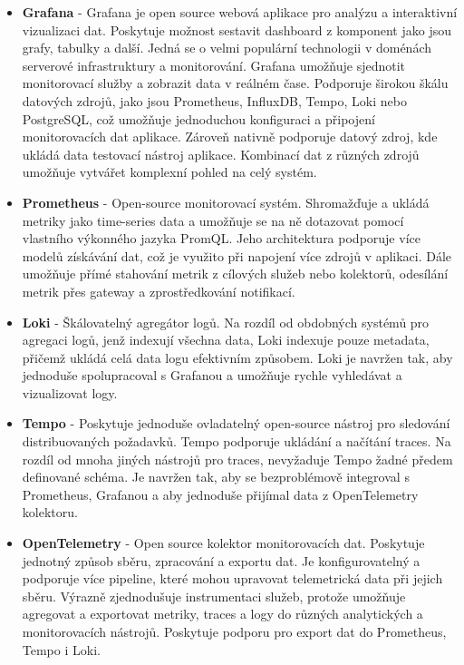 \begin{itemize}
  \item \textbf{Grafana} - Grafana je open source webová aplikace pro analýzu a interaktivní vizualizaci dat. Poskytuje možnost sestavit dashboard z komponent jako jsou grafy, tabulky a další. Jedná se o velmi populární technologii v doménách serverové infrastruktury a monitorování. Grafana umožňuje sjednotit monitorovací služby a zobrazit data v reálném čase. Podporuje širokou škálu datových zdrojů, jako jsou Prometheus, InfluxDB, Tempo, Loki nebo PostgreSQL, což umožňuje jednoduchou konfiguraci a připojení monitorovacích dat aplikace. Zároveň nativně podporuje datový zdroj, kde ukládá data testovací nástroj aplikace. Kombinací dat z různých zdrojů umožňuje vytvářet komplexní pohled na celý systém.
  \item \textbf{Prometheus} - Open-source monitorovací systém. Shromažďuje a ukládá metriky jako time-series data a umožňuje se na ně dotazovat pomocí vlastního výkonného jazyka PromQL. Jeho architektura podporuje více modelů získávání dat, což je využito při napojení více zdrojů v aplikaci. Dále umožňuje přímé stahování metrik z cílových služeb nebo kolektorů, odesílání metrik přes gateway a zprostředkování notifikací.
  \item \textbf{Loki} - Škálovatelný agregátor logů. Na rozdíl od obdobných systémů pro agregaci logů, jenž indexují všechna data, Loki indexuje pouze metadata, přičemž ukládá celá data logu efektivním způsobem. Loki je navržen tak, aby jednoduše spolupracoval s Grafanou a umožňuje rychle vyhledávat a vizualizovat logy.
  \item \textbf{Tempo} - Poskytuje jednoduše ovladatelný open-source nástroj pro sledování distribuovaných požadavků. Tempo podporuje ukládání a načítání traces. Na rozdíl od mnoha jiných nástrojů pro traces, nevyžaduje Tempo žadné předem definované schéma. Je navržen tak, aby se bezproblémově integroval s Prometheus, Grafanou a aby jednoduše přijímal data z OpenTelemetry kolektoru.
  \item \textbf{OpenTelemetry} - Open source kolektor monitorovacích dat. Poskytuje jednotný způsob sběru, zpracování a exportu dat. Je konfigurovatelný a podporuje více pipeline, které mohou upravovat telemetrická data při jejich sběru. Výrazně zjednodušuje instrumentaci služeb, protože umožňuje agregovat a exportovat metriky, traces a logy do různých analytických a monitorovacích nástrojů. Poskytuje podporu pro export dat do Prometheus, Tempo i Loki.
\end{itemize}

